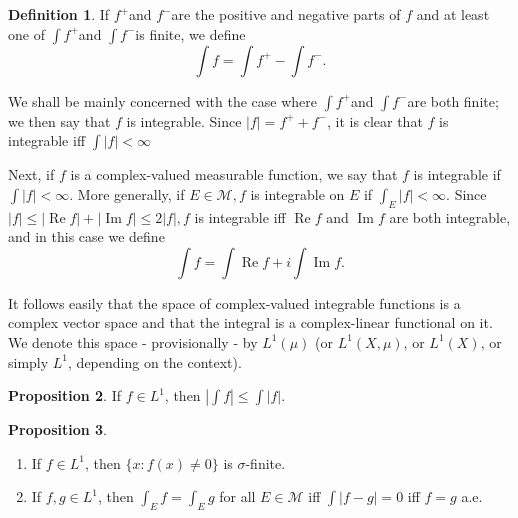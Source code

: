 \documentclass[12pt,a4paper]{book}
\newcommand{\p}{^{\prime}}
\newenvironment{enu}{\begin{enumerate}[(1)]}{\end{enumerate}}
\theoremstyle{definition}
\newtheorem{defn}{Definition}[section]
\newtheorem{rema}[defn]{Remark}
\newtheorem{prop}[defn]{Proposition}
\begin{document}
\begin{defn}
    If $f^{+}$and $f^{-}$are the positive and negative parts of $f$ and at least one of $\int f^{+}$and $\int f^{-}$is finite, we define
    $$
        \int f=\int f^{+}-\int f^{-} .
    $$

    We shall be mainly concerned with the case where $\int f^{+}$and $\int f^{-}$are both finite; we then say that $f$ is integrable. Since $|f|=f^{+}+f^{-}$, it is clear that $f$ is integrable iff $\int|f|<\infty$

    Next, if $f$ is a complex-valued measurable function, we say that $f$ is integrable if $\int|f|<\infty$. More generally, if $E \in \mathcal{M}, f$ is integrable on $E$ if $\int_E|f|<\infty$. Since $|f| \leq|\operatorname{Re} f|+|\operatorname{Im} f| \leq 2|f|, f$ is integrable iff $\operatorname{Re} f$ and $\operatorname{Im} f$ are both integrable, and in this case we define
    $$
        \int f=\int \operatorname{Re} f+i \int \operatorname{Im} f .
    $$

    It follows easily that the space of complex-valued integrable functions is a complex vector space and that the integral is a complex-linear functional on it. We denote this space - provisionally - by $L^1(\mu)$ (or $L^1(X, \mu)$, or $L^1(X)$, or simply $L^1$, depending on the context).
\end{defn}
\begin{prop}
    If $f \in L^1$, then $\left|\int f\right| \leq \int|f|$.
\end{prop}
\begin{prop}
    \begin{enu}
        \item If $f \in L^1$, then $\{x: f(x) \neq 0\}$ is $\sigma$-finite.
        \item If $f, g \in L^1$, then $\int_E f=\int_E g$ for all $E \in \mathcal{M}$ iff $\int|f-g|=0$ iff $f=g$ a.e.
    \end{enu}
\end{prop}
\end{document}
